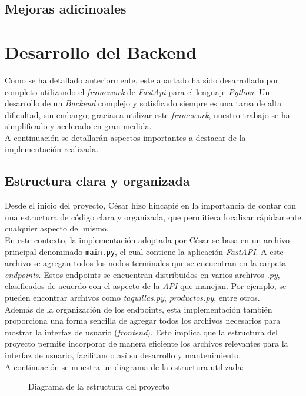 \documentclass[12pt]{report}
\begin{document}
\section{Mejoras adicinoales} %

\chapter{Desarrollo del Backend}
Como se ha detallado anteriormente, este apartado ha sido desarrollado por completo utilizando el \textit{framework} de \textit{FastApi} para el lenguaje \textit{Python}. Un desarrollo de un \textit{Backend} complejo y sotisficado siempre es una tarea de alta dificultad, sin embargo; gracias a utilizar este \textit{framework}, nuestro trabajo se ha simplificado y acelerado en gran medida.
\\
A continuación se detallarán aspectos importantes a destacar de la implementación realizada.
\section{Estructura clara y organizada}
Desde el inicio del proyecto, César hizo hincapié en la importancia de contar con una estructura de código clara y organizada, que permitiera localizar rápidamente cualquier aspecto del mismo.
\\

En este contexto, la implementación adoptada por César se basa en un archivo principal denominado \texttt{main.py}, el cual contiene la aplicación \textit{FastAPI}. A este archivo se agregan todos los nodos terminales que se encuentran en la carpeta \textit{endpoints}. Estos endpoints se encuentran distribuidos en varios archivos \textit{.py}, clasificados de acuerdo con el aspecto de la \textit{API} que manejan. Por ejemplo, se pueden encontrar archivos como \textit{taquillas.py}, \textit{productos.py}, entre otros.
\\

Además de la organización de los endpoints, esta implementación también proporciona una forma sencilla de agregar todos los archivos necesarios para mostrar la interfaz de usuario (\emph{frontend}). Esto implica que la estructura del proyecto permite incorporar de manera eficiente los archivos relevantes para la interfaz de usuario, facilitando así su desarrollo y mantenimiento.
\\

A continuación se muestra un diagrama de la estructura utilizada:
\begin{figure}[H]
    \centering
{}
\caption{Diagrama de la estructura del proyecto}
\label{fig:arbol_estructura}
\end{figure}
\end{document}
